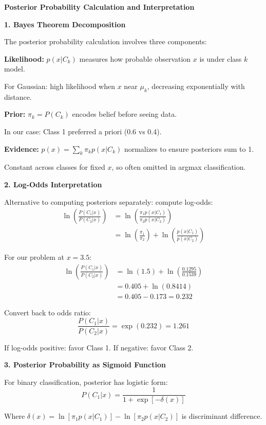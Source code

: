 \documentclass[12pt]{article}
\begin{document}
\begin{explanation}

\textbf{Posterior Probability Calculation and Interpretation}

\textbf{1. Bayes Theorem Decomposition}

The posterior probability calculation involves three components:

\textbf{Likelihood:} $p(x|C_k)$ measures how probable observation $x$ is under class $k$ model.

For Gaussian: high likelihood when $x$ near $\mu_k$, decreasing exponentially with distance.

\textbf{Prior:} $\pi_k = P(C_k)$ encodes belief before seeing data.

In our case: Class 1 preferred a priori (0.6 vs 0.4).

\textbf{Evidence:} $p(x) = \sum_k \pi_k p(x|C_k)$ normalizes to ensure posteriors sum to 1.

Constant across classes for fixed $x$, so often omitted in argmax classification.

\textbf{2. Log-Odds Interpretation}

Alternative to computing posteriors separately: compute log-odds:
\begin{align*}
\ln\left(\frac{P(C_1|x)}{P(C_2|x)}\right) &= \ln\left(\frac{\pi_1 p(x|C_1)}{\pi_2 p(x|C_2)}\right) \\
&= \ln\left(\frac{\pi_1}{\pi_2}\right) + \ln\left(\frac{p(x|C_1)}{p(x|C_2)}\right)
\end{align*}

For our problem at $x = 3.5$:
\begin{align*}
\ln\left(\frac{P(C_1|x)}{P(C_2|x)}\right) &= \ln(1.5) + \ln\left(\frac{0.1295}{0.1539}\right) \\
&= 0.405 + \ln(0.8414) \\
&= 0.405 - 0.173 = 0.232
\end{align*}

Convert back to odds ratio:
\[\frac{P(C_1|x)}{P(C_2|x)} = \exp(0.232) = 1.261\]

If log-odds positive: favor Class 1. If negative: favor Class 2.

\textbf{3. Posterior Probability as Sigmoid Function}

For binary classification, posterior has logistic form:
\[P(C_1|x) = \frac{1}{1 + \exp[-\delta(x)]}\]

Where $\delta(x) = \ln[\pi_1 p(x|C_1)] - \ln[\pi_2 p(x|C_2)]$ is discriminant difference.


\end{explanation}
\end{document}
